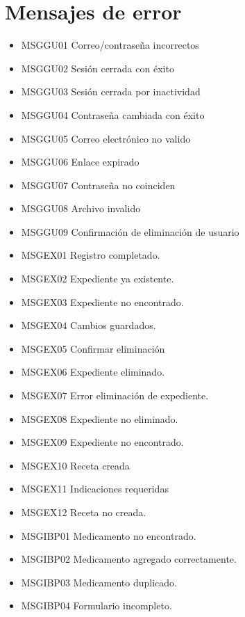 \documentclass[12pt,letterpaper]{article}
\begin{document}
        \section{Mensajes de error}
            \begin{itemize}
                \item MSGGU01 Correo/contraseña incorrectos
                \item MSGGU02 Sesión cerrada con éxito
                \item MSGGU03 Sesión cerrada por inactividad
                \item MSGGU04 Contraseña cambiada con éxito
                \item MSGGU05 Correo electrónico no valido
                \item MSGGU06 Enlace expirado
                \item MSGGU07 Contraseña no coinciden
                \item MSGGU08 Archivo invalido
                \item MSGGU09 Confirmación de eliminación de usuario
                \item MSGEX01 Registro completado.
                \item MSGEX02 Expediente ya existente.
                \item MSGEX03 Expediente no encontrado.
                \item MSGEX04 Cambios guardados.
                \item MSGEX05 Confirmar eliminación
                \item MSGEX06 Expediente eliminado.
                \item MSGEX07 Error eliminación de expediente.
                \item MSGEX08 Expediente no eliminado.
                \item MSGEX09 Expediente no encontrado.
                \item MSGEX10 Receta creada
                \item MSGEX11 Indicaciones requeridas
                \item MSGEX12 Receta no creada.
                \item MSGIBP01 Medicamento no encontrado.
                \item MSGIBP02 Medicamento agregado correctamente.
                \item MSGIBP03 Medicamento duplicado.
                \item MSGIBP04 Formulario incompleto.
            \end{itemize}
\end{document}
